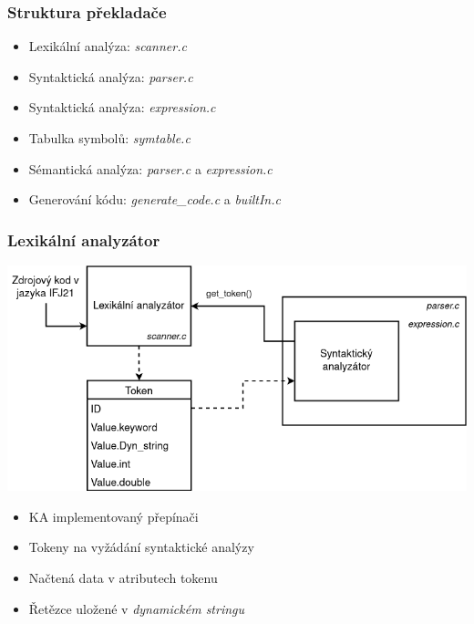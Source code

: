 \begin{frame}
  \frametitle{Struktura překladače}
    \begin{itemize}
        \setlength\itemsep{1em}
        \item Lexikální analýza: \emph{scanner.c}
        \item Syntaktická analýza: \emph{parser.c}
        \item Syntaktická analýza: \emph{expression.c}
        \item Tabulka symbolů: \emph{symtable.c}
        \item Sémantická analýza: \emph{parser.c} a \emph{expression.c}
        \item Generování kódu: \emph{generate\_code.c} a \emph{builtIn.c}
    \end{itemize}
\end{frame}



\begin{frame}
  \frametitle{Lexikální analyzátor}
    \centering
    \includegraphics[scale=0.34,keepaspectratio]{img/DiagramLex.png}
  
  \vspace{1em}
  
    \begin{itemize}
        \item KA implementovaný přepínači
        \item Tokeny na vyžádání syntaktické analýzy
        \item Načtená data v atributech tokenu
        \item Řetězce uložené v \emph{dynamickém stringu}
    \end{itemize}
\end{frame}



